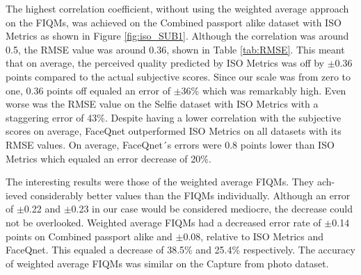 \begin{table}[h]
\caption{The calculated RMSE values of the FIQMs on the datasets relative to the subjective scores. The RMSE value was not calculated for the Selfie dataset with a weighted average of the FIQMs. The `X' symbolises this.}
\label{tab:RMSE}
\end{table}
The highest correlation coefficient, without using the weighted average approach on the FIQMs, was achieved on the Combined passport alike dataset with ISO Metrics as shown in Figure \ref{fig:iso_SUB1}. Although the correlation was around 0.5, the RMSE value was around 0.36, shown in Table \ref{tab:RMSE}. This meant that on average, the perceived quality predicted by ISO Metrics was off by $\pm$0.36 points compared to the actual subjective scores. Since our scale was from zero to one, 0.36 points off equaled an error of $\pm$36\% which was remarkably high. Even worse was the RMSE value on the Selfie dataset with ISO Metrics with a staggering error of 43\%. Despite having a lower correlation with the subjective scores on average, FaceQnet outperformed ISO Metrics on all datasets with its RMSE values. On average, FaceQnet´s errors were 0.8 points lower than ISO Metrics which equaled an error decrease of 20\%. 

The interesting results were those of the weighted average FIQMs. They ach-
ieved considerably better values than the FIQMs individually. Although an error of $\pm$0.22 and $\pm$0.23 in our case would be considered mediocre, the decrease could not be overlooked. Weighted average FIQMs had a decreased error rate of $\pm$0.14 points on Combined passport alike and $\pm$0.08, relative to ISO Metrics and FaceQnet. This equaled a decrease of 38.5\% and 25.4\% respectively. The accuracy of weighted average FIQMs was similar on the Capture from photo dataset. 


